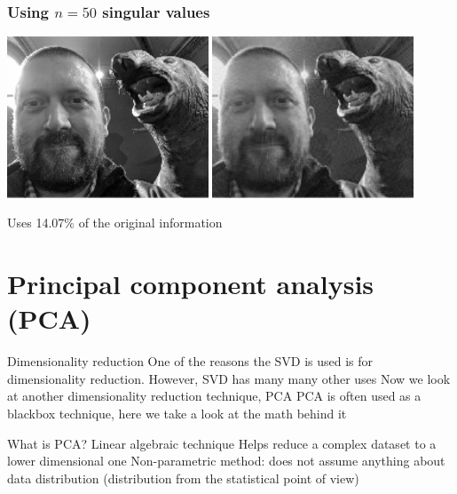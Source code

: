 \documentclass[aspectratio=169]{beamer}\usepackage[]{graphicx}\usepackage[]{xcolor}
\begin{document}
\begin{frame}\frametitle{Using $n=50$ singular values}
\begin{center}
\includegraphics[width=0.45\textwidth]{FIGS/matrix-methods-plot-image-svd-original-1.png}
\includegraphics[width=0.45\textwidth]{FIGS/matrix-methods-plot-image-svd-n50-1.png}
\end{center}
\vfill
Uses 14.07\% of the original information
\end{frame}




\section{Principal component analysis (PCA)}


\begin{frame}{Dimensionality reduction}
One of the reasons the SVD is used is for dimensionality reduction. However, SVD has many many other uses
\vfill
Now we look at another dimensionality reduction technique, PCA
\vfill
PCA is often used as a blackbox technique, here we take a look at the math behind it
\end{frame}


\begin{frame}{What is PCA?}
Linear algebraic technique 
\vfill
Helps reduce a complex dataset to a lower dimensional one
\vfill
Non-parametric method: does not assume anything about data distribution (distribution from the statistical point of view)
\end{frame}
\end{document}
